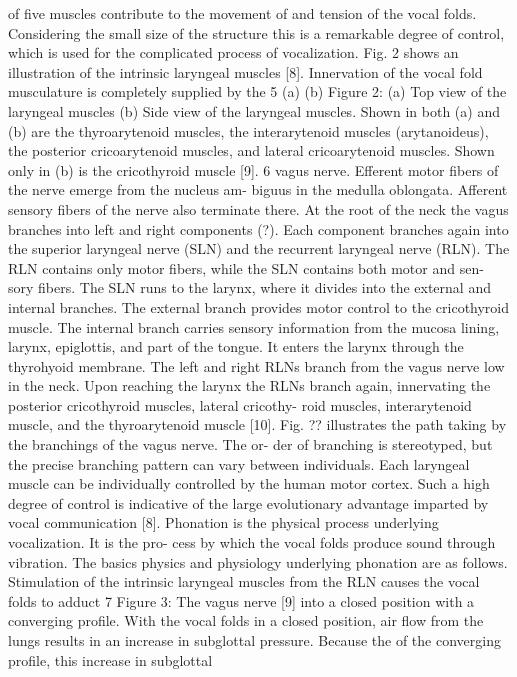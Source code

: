 \documentclass[12pt, letter]{report}
\begin{document}
of five muscles contribute to the movement of and tension of the vocal folds.
Considering the small size of the structure this is a remarkable degree of
control, which is used for the complicated process of vocalization. Fig. 2
shows an illustration of the intrinsic laryngeal muscles [8].
Innervation of the vocal fold musculature is completely supplied by the
5
(a)
 (b)
Figure 2: (a) Top view of the laryngeal muscles (b) Side view of the laryngeal
muscles. Shown in both (a) and (b) are the thyroarytenoid muscles, the
interarytenoid muscles (arytanoideus), the posterior cricoarytenoid muscles,
and lateral cricoarytenoid muscles. Shown only in (b) is the cricothyroid
muscle [9].
6
vagus nerve. Efferent motor fibers of the nerve emerge from the nucleus am-
biguus in the medulla oblongata. Afferent sensory fibers of the nerve also
terminate there. At the root of the neck the vagus branches into left and
right components (?). Each component branches again into the superior
laryngeal nerve (SLN) and the recurrent laryngeal nerve (RLN). The RLN
contains only motor fibers, while the SLN contains both motor and sen-
sory fibers. The SLN runs to the larynx, where it divides into the external
and internal branches. The external branch provides motor control to the
cricothyroid muscle. The internal branch carries sensory information from
the mucosa lining, larynx, epiglottis, and part of the tongue. It enters the
larynx through the thyrohyoid membrane. The left and right RLNs branch
from the vagus nerve low in the neck. Upon reaching the larynx the RLNs
branch again, innervating the posterior cricothyroid muscles, lateral cricothy-
roid muscles, interarytenoid muscle, and the thyroarytenoid muscle [10]. Fig.
?? illustrates the path taking by the branchings of the vagus nerve. The or-
der of branching is stereotyped, but the precise branching pattern can vary
between individuals. Each laryngeal muscle can be individually controlled
by the human motor cortex. Such a high degree of control is indicative of
the large evolutionary advantage imparted by vocal communication [8].
Phonation is the physical process underlying vocalization. It is the pro-
cess by which the vocal folds produce sound through vibration. The basics
physics and physiology underlying phonation are as follows. Stimulation of
the intrinsic laryngeal muscles from the RLN causes the vocal folds to adduct
7
Figure 3: The vagus nerve [9]
into a closed position with a converging profile. With the vocal folds in a
closed position, air flow from the lungs results in an increase in subglottal
pressure. Because the of the converging profile, this increase in subglottal
\end{document}
